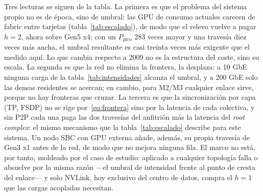 \documentclass[a4paper,11pt]{article}
\begin{document}
Tres lecturas se siguen de la tabla. La primera es que el problema del sistema propio no es de época, sino de umbral: las GPU de
consumo actuales carecen de fabric entre tarjetas (tabla~\ref{tab:escalado}), de modo que el relevo vuelve a pagar $h=2$, ahora
sobre Gen5 x4; con un $P_{\text{pico}}$ 283 veces mayor y una travesía diez veces más ancha, el umbral resultante es casi treinta
veces más exigente que el medido aquí. Lo que cambia respecto a 2009 no es la estructura del coste, sino su escala. La segunda es
que la red no elimina la frontera, la desplaza: a 10 GbE ninguna carga de la tabla~\ref{tab:intensidades} alcanza el umbral, y a
200 GbE solo las densas residentes se acercan; en cambio, para M2/M3 cualquier enlace sirve, porque no hay fronteras que cruzar.
La tercera es que la sincronización por capa (TP, FSDP) no se rige por~\eqref{eq:frontera} sino por la latencia de cada colectiva,
y sin P2P cada una paga las dos travesías del anfitrión más la latencia del \textit{root complex}: el mismo mecanismo que la
tabla~\ref{tab:escalado} describe para este sistema. Un nodo SBC con GPU externa añade, además, su propia travesía de Gen3 x1
antes de la red, de modo que no mejora ninguna fila. El marco no está, por tanto, moldeado por el caso de estudio: aplicado a
cualquier topología falla o absuelve por la misma razón ---el umbral de intensidad frente al punto de cresta del enlace--- y solo
NVLink, hoy exclusivo del centro de datos, compra el $h=1$ que las cargas acopladas necesitan.
\end{document}
